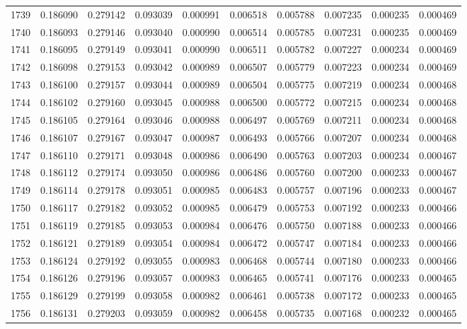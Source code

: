 \begin{tabular}{lrrrrrrrrr}
1739 & 0.186090 & 0.279142 & 0.093039 & 0.000991 & 0.006518 & 0.005788 & 0.007235 & 0.000235 & 0.000469 \\
1740 & 0.186093 & 0.279146 & 0.093040 & 0.000990 & 0.006514 & 0.005785 & 0.007231 & 0.000235 & 0.000469 \\
1741 & 0.186095 & 0.279149 & 0.093041 & 0.000990 & 0.006511 & 0.005782 & 0.007227 & 0.000234 & 0.000469 \\
1742 & 0.186098 & 0.279153 & 0.093042 & 0.000989 & 0.006507 & 0.005779 & 0.007223 & 0.000234 & 0.000469 \\
1743 & 0.186100 & 0.279157 & 0.093044 & 0.000989 & 0.006504 & 0.005775 & 0.007219 & 0.000234 & 0.000468 \\
1744 & 0.186102 & 0.279160 & 0.093045 & 0.000988 & 0.006500 & 0.005772 & 0.007215 & 0.000234 & 0.000468 \\
1745 & 0.186105 & 0.279164 & 0.093046 & 0.000988 & 0.006497 & 0.005769 & 0.007211 & 0.000234 & 0.000468 \\
1746 & 0.186107 & 0.279167 & 0.093047 & 0.000987 & 0.006493 & 0.005766 & 0.007207 & 0.000234 & 0.000468 \\
1747 & 0.186110 & 0.279171 & 0.093048 & 0.000986 & 0.006490 & 0.005763 & 0.007203 & 0.000234 & 0.000467 \\
1748 & 0.186112 & 0.279174 & 0.093050 & 0.000986 & 0.006486 & 0.005760 & 0.007200 & 0.000233 & 0.000467 \\
1749 & 0.186114 & 0.279178 & 0.093051 & 0.000985 & 0.006483 & 0.005757 & 0.007196 & 0.000233 & 0.000467 \\
1750 & 0.186117 & 0.279182 & 0.093052 & 0.000985 & 0.006479 & 0.005753 & 0.007192 & 0.000233 & 0.000466 \\
1751 & 0.186119 & 0.279185 & 0.093053 & 0.000984 & 0.006476 & 0.005750 & 0.007188 & 0.000233 & 0.000466 \\
1752 & 0.186121 & 0.279189 & 0.093054 & 0.000984 & 0.006472 & 0.005747 & 0.007184 & 0.000233 & 0.000466 \\
1753 & 0.186124 & 0.279192 & 0.093055 & 0.000983 & 0.006468 & 0.005744 & 0.007180 & 0.000233 & 0.000466 \\
1754 & 0.186126 & 0.279196 & 0.093057 & 0.000983 & 0.006465 & 0.005741 & 0.007176 & 0.000233 & 0.000465 \\
1755 & 0.186129 & 0.279199 & 0.093058 & 0.000982 & 0.006461 & 0.005738 & 0.007172 & 0.000233 & 0.000465 \\
1756 & 0.186131 & 0.279203 & 0.093059 & 0.000982 & 0.006458 & 0.005735 & 0.007168 & 0.000232 & 0.000465 \\

\end{tabular}
